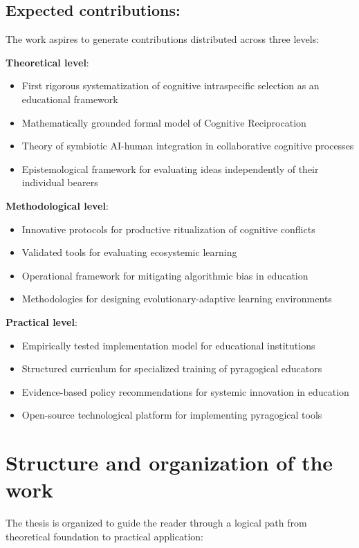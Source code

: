 \subsection{Expected contributions:}

The work aspires to generate contributions distributed across three levels:

\textbf{Theoretical level}:
\begin{itemize}
	\item First rigorous systematization of cognitive intraspecific selection as an educational framework
	\item Mathematically grounded formal model of Cognitive Reciprocation
	\item Theory of symbiotic AI-human integration in collaborative cognitive processes
	\item Epistemological framework for evaluating ideas independently of their individual bearers
\end{itemize}

\textbf{Methodological level}:
\begin{itemize}
	\item Innovative protocols for productive ritualization of cognitive conflicts
	\item Validated tools for evaluating ecosystemic learning
	\item Operational framework for mitigating algorithmic bias in education
	\item Methodologies for designing evolutionary-adaptive learning environments
\end{itemize}

\textbf{Practical level}:
\begin{itemize}
	\item Empirically tested implementation model for educational institutions
	\item Structured curriculum for specialized training of pyragogical educators
	\item Evidence-based policy recommendations for systemic innovation in education
	\item Open-source technological platform for implementing pyragogical tools
\end{itemize}

\section{Structure and organization of the work}

The thesis is organized to guide the reader through a logical path from theoretical foundation to practical application:

